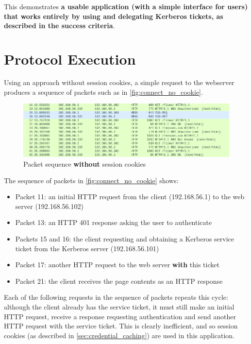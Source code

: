\documentclass[12pt]{report}
\begin{document}
This demonstrates \textbf{a usable application (with a simple interface for users) that works entirely by using and delegating Kerberos tickets, as described in the success criteria}.

\section{Protocol Execution}
\label{sec:protocol_execution}
Using an approach without session cookies, a simple request to the webserver produces a sequence of packets such as in \autoref{fig:connect_no_cookie}.

\begin{figure}[h]
  \begin{center}
    \includegraphics[width=\textwidth]{09-connect-no-cookie.png}
  \end{center}
  \caption{Packet sequence \textbf{without} session cookies}
  \label{fig:connect_no_cookie}
\end{figure}

The sequence of packets in \autoref{fig:connect_no_cookie} shows:

\begin{itemize}
\item
  Packet 11: an initial HTTP request from the client (192.168.56.1) to the web server (192.168.56.102)
\item
  Packet 13: an HTTP 401 response asking the user to authenticate
\item
  Packets 15 and 16: the client requesting and obtaining a Kerberos service ticket from the Kerberos server (192.168.56.101)
\item
  Packet 17: another HTTP request to the web server \textbf{with} this ticket
\item
  Packet 21: the client receives the page contents as an HTTP response
\end{itemize}

Each of the following requests in the sequence of packets repeats this cycle: although the client already has the service ticket, it must still make an initial HTTP request, receive a response requesting authentication and send another HTTP request with the service ticket. This is clearly inefficient, and so session cookies (as described in \autoref{sec:credential_caching}) are used in this application.
\end{document}
